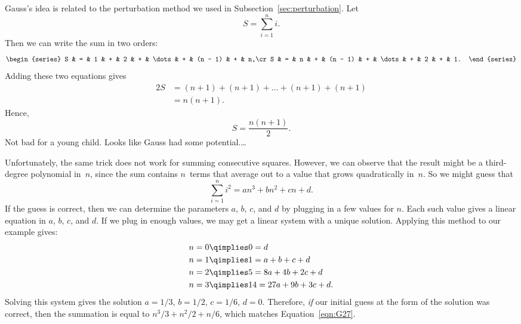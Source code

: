 Gauss's idea is related to the perturbation method we used in
Subsection~\ref{sec:perturbation}.  Let
\begin{equation*}
    S = \sum_{i = 1}^n i.
\end{equation*}
Then we can write the sum in two orders:
\begin{equation*}
    \begin{series}
        S & = & 1 & + & 2       & + & \dots & + & (n - 1) & + & n,\cr
        S & = & n & + & (n - 1) & + & \dots & + & 2       & + & 1.
    \end{series}
\end{equation*}
Adding these two equations gives
\begin{align*}
    2S  & = (n + 1) + (n + 1) + \dots + (n + 1) + (n + 1) \\
        & = n (n + 1).
\end{align*}
Hence,
\begin{equation*}
    S = \frac{n (n + 1)}{2}.
\end{equation*}
Not bad for a young child.  Looks like Gauss had some potential.\dots

Unfortunately, the same trick does not work for summing consecutive
squares.  However, we can observe that the result might be a
third-degree polynomial in~$n$, since the sum contains $n$~terms that
average out to a value that grows quadratically in~$n$.  So we might
guess that
\begin{equation*}
    \sum_{i=1}^n i^2 = an^3 + bn^2 + cn + d.
\end{equation*}
If the guess is correct, then we can determine the parameters $a$,
$b$, $c$, and $d$ by plugging in a few values for $n$.  Each such
value gives a linear equation in $a$, $b$, $c$, and $d$.  If we plug
in enough values, we may get a linear system with a unique solution.
Applying this method to our example gives:
\begin{align*}
n = 0 & \qimplies  0 = d \\
n = 1 & \qimplies  1 = a + b + c + d \\
n = 2 & \qimplies  5 = 8a + 4b + 2c + d \\
n = 3 & \qimplies  14 = 27a + 9b + 3c + d.
\end{align*}
Solving this system gives the solution $a = 1/3$, $b = 1/2$, $c =
1/6$, $d = 0$.  Therefore, \emph{if} our initial guess at the form of
the solution was correct, then the summation is equal to $n^3/3 +
n^2/2 + n/6$, which matches Equation~\eqref{eqn:G27}.

